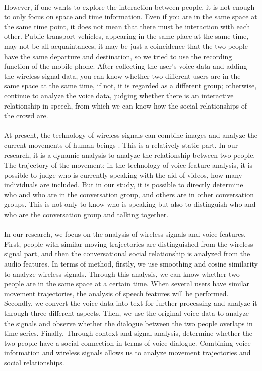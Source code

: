 \documentclass[a4paper,12pt]{report}
\begin{document}
\paragraph{}
However, if one wants to explore the interaction between people, it is not enough to only focus on space and time information. Even if you are in the same space at the same time point, it does not mean that there must be interaction with each other. Public transport vehicles, appearing in the same place at the same time, may not be all acquaintances, it may be just a coincidence that the two people have the same departure and destination, so we tried to use the recording function of the mobile phone. After collecting the user's voice data and adding the wireless signal data, you can know whether two different users are in the same space at the same time, if not, it is regarded as a different group; otherwise, continue to analyze the voice data, judging whether there is an interactive relationship in speech, from which we can know how the social relationships of the crowd are.

\paragraph{}
At present, the technology of wireless signals can combine images and analyze the current movements of human beings\cite{zou2019wifi} \cite{guo2021improving}. This is a relatively static part. In our research, it is a dynamic analysis to analyze the relationship between two people. The trajectory of the movement; in the technology of voice feature analysis, it is possible to judge who is currently speaking with the aid of videos\cite{roth2020ava}, how many individuals are included\cite{yasmin2019speaker}. But in our study, it is possible to directly determine who and who are in the conversation group, and others are in other conversation groups. This is not only to know who is speaking but also to distinguish who and who are the conversation group and talking together.
\paragraph{}
In our research, we focus on the analysis of wireless signals and voice features. First, people with similar moving trajectories are distinguished from the wireless signal part, and then the conversational social relationship is analyzed from the audio features. In terms of method, firstly, we use smoothing and cosine similarity to analyze wireless signals\cite{chen2019witrack}. Through this analysis, we can know whether two people are in the same space at a certain time. When several users have similar movement trajectories, the analysis of speech features will be performed. Secondly, we convert the voice data into text for further processing and analyze it through three different aspects. Then, we use the original voice data to analyze the signals and observe whether the dialogue between the two people overlaps in time series. Finally, Through context and signal analysis, determine whether the two people have a social connection in terms of voice dialogue. Combining voice information and wireless signals allows us to analyze movement trajectories and social relationships. 
\\
\end{document}
